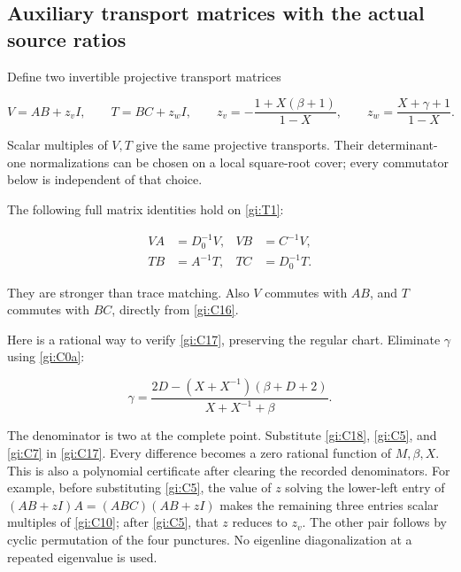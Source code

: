 \subsection{Auxiliary transport matrices with the actual source ratios}\label{gi:auxiliary-transport-matrices-with-the-actual-source-ratios}

Define two invertible projective transport matrices

\begin{equation}\label{gi:C16}
V=AB+z_v I,\qquad T=BC+z_w I,
 \qquad
 z_v=-\frac{1+X(\beta+1)}{1-X},\qquad
 z_w=\frac{X+\gamma+1}{1-X}.
\end{equation}

Scalar multiples of \(V,T\) give the same projective transports. Their determinant-one normalizations can be chosen on a local square-root cover; every commutator below is independent of that choice.

The following full matrix identities hold on \eqref{gi:T1}:

\begin{equation}\label{gi:C17}
\begin{aligned}
 VA&=D_0^{-1}V,& VB&=C^{-1}V,\\
 TB&=A^{-1}T,& TC&=D_0^{-1}T.
 \end{aligned}
\end{equation}

They are stronger than trace matching. Also \(V\) commutes with \(AB\), and \(T\) commutes with \(BC\), directly from \eqref{gi:C16}.

Here is a rational way to verify \eqref{gi:C17}, preserving the regular chart. Eliminate \(\gamma\) using \eqref{gi:C0a}:

\begin{equation}\label{gi:C18}
\gamma=\frac{2D-(X+X^{-1})(\beta+D+2)}
                         {X+X^{-1}+\beta}.
\end{equation}

The denominator is two at the complete point. Substitute \eqref{gi:C18}, \eqref{gi:C5}, and \eqref{gi:C7} in \eqref{gi:C17}. Every difference becomes a zero rational function of \(M,\beta,X\). This is also a polynomial certificate after clearing the recorded denominators. For example, before substituting \eqref{gi:C5}, the value of \(z\) solving the lower-left entry of
\((AB+zI)A=(ABC)(AB+zI)\) makes the remaining three entries scalar multiples of \eqref{gi:C10}; after \eqref{gi:C5}, that \(z\) reduces to \(z_v\). The other pair follows by cyclic permutation of the four punctures. No eigenline diagonalization at a repeated eigenvalue is used.

